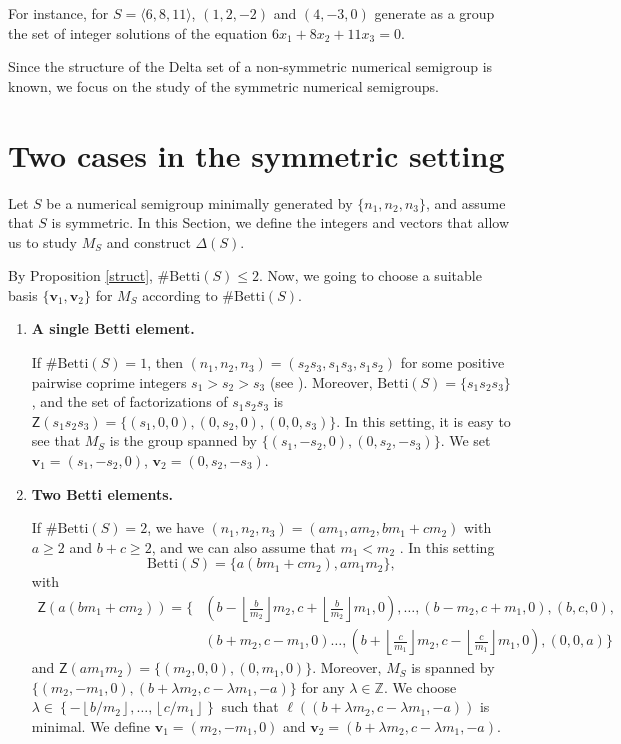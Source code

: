 \documentclass[11pt]{amsart}
\theoremstyle{remark}
\begin{document}
For instance, for $S=\langle 6,8,11\rangle$, $(1,2,-2)$ and $(4,-3,0)$ generate as a group the set of integer solutions of the equation $6x_1+8x_2+11x_3=0$.  

Since the structure of the Delta set of a non-symmetric numerical semigroup is known, we focus on the study of the symmetric numerical semigroups.



\section{Two cases in the symmetric setting}\label{sec:uno}
Let $S$ be a numerical semigroup minimally generated by $\{n_1,n_2,n_3\}$, and assume that $S$ is symmetric. In this Section, we define the integers and vectors that allow us to study $M_S$ and construct $\Delta(S)$. %

By Proposition \ref{struct}, $\#\mathrm{Betti}(S) \le 2$. Now, we going to choose a suitable basis $\{\mathbf v_1, \mathbf v_2 \}$ for $M_S$ according to $\#\mathrm{Betti}(S)$.

\begin{enumerate}[(1)]
	\item \textbf{A single Betti element.}
	
	\noindent If $\#\mathrm{Betti}(S)=1$, then $(n_1,n_2,n_3)=(s_2s_3,s_1s_3,s_1s_2)$ for some positive pairwise coprime integers $s_1>s_2>s_3$ (see \cite{single}). Moreover, $\mathrm{Betti}(S)=\{s_1s_2s_3\}$, and the set of factorizations of $s_1s_2s_3$ is  $\mathsf Z(s_1s_2s_3)=\{(s_1,0,0),(0,s_2,0),(0,0,s_3)\}$.
	In this setting, it is easy to see that $M_S$ is the group spanned by $\{(s_1,-s_2,0),(0,s_2,-s_3)\}$. We set 
	$\mathbf v_1=(s_1,-s_2,0)$, $\mathbf v_2=(0,s_2,-s_3)$.
	
	\item \textbf{Two Betti elements.}
	
	\noindent If $\#\mathrm{Betti}(S)=2$, we have $(n_1,n_2,n_3)=(am_1,am_2,bm_1+cm_2)$ with $a\ge 2$ and $b+c\ge 2$, and we can also assume that $m_1<m_2$ \cite[Theorem 10.6]{RG}. In this setting \[\mathrm{Betti}(S)=\{a(bm_1+cm_2), am_1m_2\},\]
	with 
	\begin{align*}
	    \mathsf Z(a(bm_1+cm_2))=\Big\{ & \left(b-\left\lfloor\tfrac{b}{m_2}\right\rfloor m_2,c+\left\lfloor\tfrac{b}{m_2}\right\rfloor m_1,0\right),\ldots,(b-m_2,c+m_1,0),(b,c,0), \\ & (b+m_2,c-m_1,0)\ldots, \left(b+\left\lfloor\tfrac{c}{m_1}\right\rfloor m_2,c-\left\lfloor\tfrac{c}{m_1}\right\rfloor m_1,0\right),(0,0,a)\Big\}
	\end{align*} 
	and $\mathsf Z(am_1m_2)=\{(m_2,0,0),(0,m_1,0)\}$. Moreover, $M_S$ is spanned by $\{(m_2,-m_1,0),(b+\lambda m_2,c-\lambda m_1,-a)\}$ 
	for any $\lambda \in \mathbb Z$. We choose 
	$\lambda\in\left\{-\left\lfloor{b}/{m_2}\right\rfloor,\ldots,\left\lfloor{c}/{m_1}\right\rfloor\right\}$ such that $\ell((b+\lambda m_2,c-\lambda m_1,-a))$ is minimal. We define $\mathbf v_1=(m_2,-m_1,0)$ and $\mathbf v_2= (b+\lambda m_2,c-\lambda m_1,-a)$.  
\end{enumerate}
\end{document}
